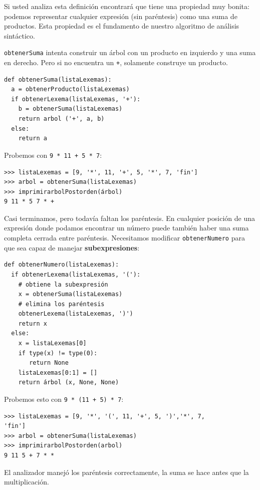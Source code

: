 
Si usted analiza esta definición encontrará que tiene una propiedad
muy bonita: podemos representar cualquier expresión (sin paréntesis)
como una suma de productos. Esta propiedad es el fundamento de nuestro
algoritmo de análisis sintáctico.

\texttt{obtenerSuma} intenta construir un árbol con un producto en
izquierdo y una suma en derecho. Pero si no encuentra un \texttt{+},
solamente construye un producto.

\beforeverb 
\begin{verbatim}
def obtenerSuma(listaLexemas):
  a = obtenerProducto(listaLexemas)
  if obtenerLexema(listaLexemas, '+'):
    b = obtenerSuma(listaLexemas)
    return arbol ('+', a, b)
  else:
    return a
\end{verbatim}
\afterverb Probemos con \texttt{9 {*} 11 + 5 {*} 7}:

\beforeverb 
\begin{verbatim}
>>> listaLexemas = [9, '*', 11, '+', 5, '*', 7, 'fin']
>>> arbol = obtenerSuma(listaLexemas)
>>> imprimirarbolPostorden(árbol)
9 11 * 5 7 * +
\end{verbatim}
\afterverb Casi terminamos, pero todavía faltan los paréntesis. En
cualquier posición de una expresión donde podamos encontrar un número
puede también haber una suma completa cerrada entre paréntesis. Necesitamos
modificar \texttt{obtenerNumero} para que sea capaz de manejar \textbf{subexpresiones}:


\beforeverb 
\begin{verbatim}
def obtenerNumero(listaLexemas):
  if obtenerLexema(listaLexemas, '('):
    # obtiene la subexpresión
    x = obtenerSuma(listaLexemas)  
    # elimina los paréntesis
    obtenerLexema(listaLexemas, ')') 
    return x
  else:
    x = listaLexemas[0]
    if type(x) != type(0): 
       return None
    listaLexemas[0:1] = []
    return árbol (x, None, None)    
\end{verbatim}
\afterverb Probemos esto con \texttt{9 {*} (11 + 5) {*} 7}:

\beforeverb 
\begin{verbatim}
>>> listaLexemas = [9, '*', '(', 11, '+', 5, ')','*', 7, 
'fin']
>>> arbol = obtenerSuma(listaLexemas)
>>> imprimirarbolPostorden(arbol)
9 11 5 + 7 * *
\end{verbatim}
\afterverb %

El analizador manejó los paréntesis correctamente, la suma se hace
antes que la multiplicación.

